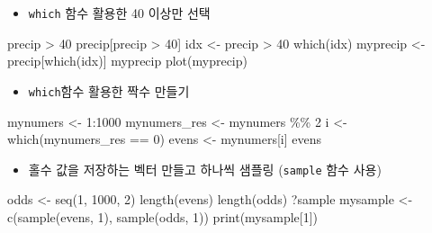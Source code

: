\documentclass[
]{book}
\newenvironment{Shaded}{\begin{snugshade}}{\end{snugshade}}
\newcommand{\DecValTok}[1]{\textcolor[rgb]{0.00,0.00,0.81}{#1}}
\newcommand{\FunctionTok}[1]{\textcolor[rgb]{0.00,0.00,0.00}{#1}}
\newcommand{\NormalTok}[1]{#1}
\newcommand{\OtherTok}[1]{\textcolor[rgb]{0.56,0.35,0.01}{#1}}
\newcommand{\SpecialCharTok}[1]{\textcolor[rgb]{0.00,0.00,0.00}{#1}}
\providecommand{\tightlist}{%
  \setlength{\itemsep}{0pt}\setlength{\parskip}{0pt}}
\begin{document}
\begin{itemize}
\tightlist
\item
  \texttt{which} 함수 활용한 40 이상만 선택
\end{itemize}

\begin{Shaded}
\begin{Highlighting}[]
\NormalTok{precip }\SpecialCharTok{\textgreater{}} \DecValTok{40}
\NormalTok{precip[precip }\SpecialCharTok{\textgreater{}} \DecValTok{40}\NormalTok{]}
\NormalTok{idx }\OtherTok{\textless{}{-}}\NormalTok{ precip }\SpecialCharTok{\textgreater{}} \DecValTok{40}
\FunctionTok{which}\NormalTok{(idx)}
\NormalTok{myprecip }\OtherTok{\textless{}{-}}\NormalTok{ precip[}\FunctionTok{which}\NormalTok{(idx)]}
\NormalTok{myprecip}
\FunctionTok{plot}\NormalTok{(myprecip)}
\end{Highlighting}
\end{Shaded}

\begin{itemize}
\tightlist
\item
  \texttt{which}함수 활용한 짝수 만들기
\end{itemize}

\begin{Shaded}
\begin{Highlighting}[]
\NormalTok{mynumers }\OtherTok{\textless{}{-}} \DecValTok{1}\SpecialCharTok{:}\DecValTok{1000}
\NormalTok{mynumers\_res }\OtherTok{\textless{}{-}}\NormalTok{ mynumers }\SpecialCharTok{\%\%} \DecValTok{2}
\NormalTok{i }\OtherTok{\textless{}{-}} \FunctionTok{which}\NormalTok{(mynumers\_res }\SpecialCharTok{==} \DecValTok{0}\NormalTok{)}
\NormalTok{evens }\OtherTok{\textless{}{-}}\NormalTok{ mynumers[i]}
\NormalTok{evens}
\end{Highlighting}
\end{Shaded}

\begin{itemize}
\tightlist
\item
  홀수 값을 저장하는 벡터 만들고 하나씩 샘플링 (\texttt{sample} 함수 사용)
\end{itemize}

\begin{Shaded}
\begin{Highlighting}[]
\NormalTok{odds }\OtherTok{\textless{}{-}} \FunctionTok{seq}\NormalTok{(}\DecValTok{1}\NormalTok{, }\DecValTok{1000}\NormalTok{, }\DecValTok{2}\NormalTok{)}
\FunctionTok{length}\NormalTok{(evens)}
\FunctionTok{length}\NormalTok{(odds)}
\NormalTok{?sample}
\NormalTok{mysample }\OtherTok{\textless{}{-}} \FunctionTok{c}\NormalTok{(}\FunctionTok{sample}\NormalTok{(evens, }\DecValTok{1}\NormalTok{), }\FunctionTok{sample}\NormalTok{(odds, }\DecValTok{1}\NormalTok{))}
\FunctionTok{print}\NormalTok{(mysample[}\DecValTok{1}\NormalTok{])}
\end{Highlighting}
\end{Shaded}
\end{document}
